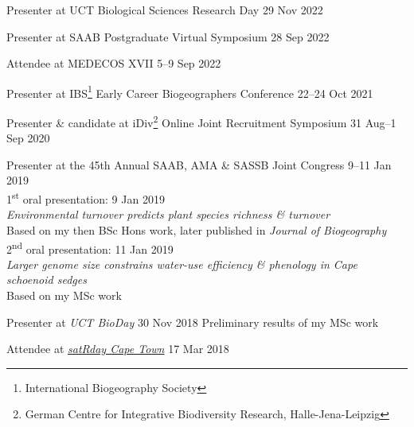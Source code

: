 \documentclass[10pt]{article}
\begin{document}
\begin{hangparas}{2em}{1}

Presenter at UCT Biological Sciences Research Day             \hfill 29 Nov 2022

Presenter at SAAB Postgraduate Virtual Symposium              \hfill 28 Sep 2022

Attendee at MEDECOS XVII                                    \hfill 5--9 Sep 2022

Presenter at IBS\footnote{International Biogeography Society}
Early Career Biogeographers Conference                    \hfill 22--24 Oct 2021

Presenter \& candidate at iDiv\footnote{German Centre for Integrative
Biodiversity Research, Halle-Jena-Leipzig} Online Joint Recruitment Symposium
                                                       \hfill 31 Aug--1 Sep 2020

Presenter at the 45th Annual SAAB, AMA \& SASSB Joint Congress
                                                        \hfill 9--11 Jan 2019 \\
\hspace{2em} 1\textsuperscript{st} oral presentation:       \hfill 9 Jan 2019 \\
\hspace{4em} \textit{Environmental turnover predicts plant species richness \& 
turnover}                                                                     \\
\hspace{4em} Based on my then BSc Hons work, later published in \textit{Journal
of Biogeography}                                                              \\
\hspace{2em} 2\textsuperscript{nd} oral presentation:      \hfill 11 Jan 2019 \\
\hspace{4em} \textit{Larger genome size constrains water-use efficiency \&
phenology in Cape schoenoid sedges}                                           \\
\hspace{4em} Based on my MSc work

Presenter at \textit{UCT BioDay}                       \hfill 30 Nov 2018 \break
Preliminary results of my MSc work

Attendee at \href{https://capetown2018.satrdays.org}{\textit{satRday Cape Town}}
                                                              \hfill 17 Mar 2018

\hfill

\end{hangparas}
\end{document}
